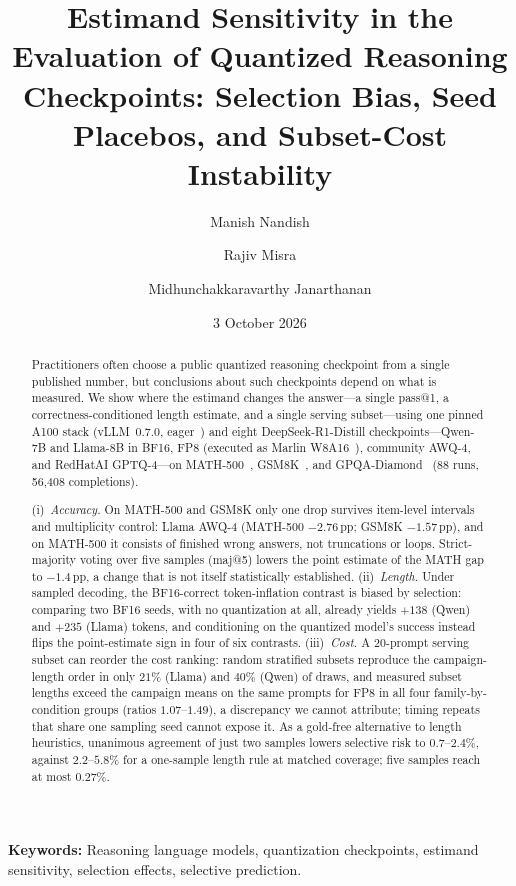 \documentclass[11pt,a4paper]{article}
\title{\textbf{Estimand Sensitivity in the Evaluation of Quantized Reasoning Checkpoints: Selection Bias, Seed Placebos, and Subset-Cost Instability}}
\author[1,2]{Manish Nandish}
\author[1]{Rajiv Misra}
\author[2]{Midhunchakkaravarthy Janarthanan}
\affil[1]{Department of Computer Science and Engineering, Indian Institute of Technology Patna, Patna, Bihar, India\\
\texttt{manish\_25s21res58@iitp.ac.in}, \texttt{rajivm@iitp.ac.in}}
\affil[2]{Lincoln University College, Malaysia\\
\texttt{midhun@lincoln.edu.my}}
\date{3 October 2026}
\begin{document}
\maketitle

\begin{abstract}
Practitioners often choose a public quantized reasoning checkpoint from a single published number, but conclusions about such checkpoints depend on what is measured. We show where the estimand changes the answer---a single pass@1, a correctness-conditioned length estimate, and a single serving subset---using one pinned A100 stack (vLLM~0.7.0, eager~\cite{kwon2023vllm}) and eight DeepSeek-R1-Distill checkpoints---Qwen-7B and Llama-8B in BF16, FP8 (executed as Marlin W8A16~\cite{frantar2024marlin}), community AWQ-4, and RedHatAI GPTQ-4---on MATH-500~\cite{hendrycks2021math,lightman2023lets}, GSM8K~\cite{cobbe2021gsm8k}, and GPQA-Diamond~\cite{rein2023gpqa} (88 runs, 56{,}408 completions).

(i)~\emph{Accuracy.} On MATH-500 and GSM8K only one drop survives item-level intervals and multiplicity control: Llama AWQ-4 (MATH-500 $-2.76$\,pp; GSM8K $-1.57$\,pp), and on MATH-500 it consists of finished wrong answers, not truncations or loops. Strict-majority voting over five samples (maj@5) lowers the point estimate of the MATH gap to $-1.4$\,pp, a change that is not itself statistically established. (ii)~\emph{Length.} Under sampled decoding, the BF16-correct token-inflation contrast is biased by selection: comparing two BF16 seeds, with no quantization at all, already yields $+138$ (Qwen) and $+235$ (Llama) tokens, and conditioning on the quantized model's success instead flips the point-estimate sign in four of six contrasts. (iii)~\emph{Cost.} A 20-prompt serving subset can reorder the cost ranking: random stratified subsets reproduce the campaign-length order in only $21\%$ (Llama) and $40\%$ (Qwen) of draws, and measured subset lengths exceed the campaign means on the same prompts for FP8 in all four family-by-condition groups (ratios $1.07$--$1.49$), a discrepancy we cannot attribute; timing repeats that share one sampling seed cannot expose it. As a gold-free alternative to length heuristics, unanimous agreement of just two samples lowers selective risk to $0.7$--$2.4\%$, against $2.2$--$5.8\%$ for a one-sample length rule at matched coverage; five samples reach at most $0.27\%$.
\end{abstract}

\vspace{0.6em}
\noindent\textbf{Keywords:} Reasoning language models, quantization checkpoints, estimand sensitivity, selection effects, selective prediction.
\end{document}
